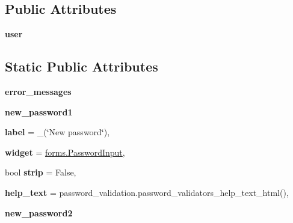 \subsection*{Public Attributes}
\begin{DoxyCompactItemize}
\item 
\mbox{\label{classdjango_1_1contrib_1_1auth_1_1forms_1_1_set_password_form_ada3d143350223734796cc35b9a450872}} 
{\bfseries user}
\end{DoxyCompactItemize}
\subsection*{Static Public Attributes}
\begin{DoxyCompactItemize}
\item 
\mbox{\label{classdjango_1_1contrib_1_1auth_1_1forms_1_1_set_password_form_aaf15a7ffe6c131bc1376e0b9009ccf1f}} 
{\bfseries error\+\_\+messages}
\item 
\mbox{\label{classdjango_1_1contrib_1_1auth_1_1forms_1_1_set_password_form_a8915706b3b86c89eda3383b3b51689a0}} 
{\bfseries new\+\_\+password1}
\item 
\mbox{\label{classdjango_1_1contrib_1_1auth_1_1forms_1_1_set_password_form_aaaf0ce6fe82a9e6e86fd656967bd31fe}} 
{\bfseries label} = \+\_\+(\char`\"{}New password\char`\"{}),
\item 
\mbox{\label{classdjango_1_1contrib_1_1auth_1_1forms_1_1_set_password_form_a07ac15bfe04611d28a7b7f8db3c86e89}} 
{\bfseries widget} = \mbox{\hyperlink{classdjango_1_1forms_1_1widgets_1_1_password_input}{forms.\+Password\+Input}},
\item 
\mbox{\label{classdjango_1_1contrib_1_1auth_1_1forms_1_1_set_password_form_a821b1dfc37c4dade1998e0f8277e1e54}} 
bool {\bfseries strip} = False,
\item 
\mbox{\label{classdjango_1_1contrib_1_1auth_1_1forms_1_1_set_password_form_ad788edd1aecd638adc1c2ea487ddd48c}} 
{\bfseries help\+\_\+text} = password\+\_\+validation.\+password\+\_\+validators\+\_\+help\+\_\+text\+\_\+html(),
\item 
\mbox{\label{classdjango_1_1contrib_1_1auth_1_1forms_1_1_set_password_form_a6c9e958079a3ae61d62fc108d3b031e6}} 
{\bfseries new\+\_\+password2}
\end{DoxyCompactItemize}


